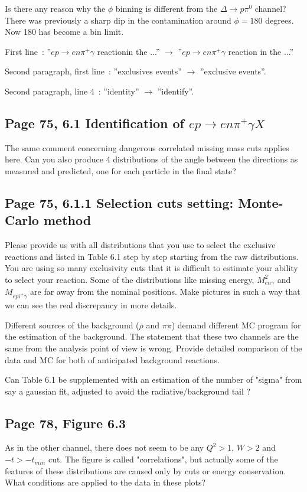 \documentclass[11pt]{paper}
\begin{document}
Is there any reason why the $\phi$ binning is different from the $\Delta\rightarrow p\pi^0$ channel?
There was previously a sharp dip in the contamination around $\phi=180$ degrees.
Now 180 has become a bin limit.

First line~: ''$ep\rightarrow en\pi^+\gamma$ reactionin the ...'' $\rightarrow$ ''$ep\rightarrow en\pi^+\gamma$ reaction in the ...''

Second paragraph, first line~: ''exclusives events'' $\rightarrow$ ''exclusive events''.

Second paragraph, line 4~: ''identity'' $\rightarrow$ ''identify''.
 
\subsection*{Page 75, 6.1 Identification of $ep\rightarrow en\pi^+\gamma X$}
 
The same comment concerning dangerous correlated missing mass cuts applies here.
Can you also produce 4 distributions of the angle between the directions as measured and predicted, one for each particle in the final state?

\subsection*{Page 75, 6.1.1 Selection cuts setting: Monte-Carlo method} 

Please provide us with all distributions that you use to select the exclusive reactions and listed in Table 6.1 step by step starting from the raw distributions. 
You are using so many exclusivity cuts that it is difficult to estimate your ability to select your reaction. 
Some of the distributions like missing energy, $M^2_{en\gamma}$ and $M_{epi^+\gamma} $ are
far away from the nominal positions. Make pictures in such a way that we can see the real discrepancy in more details. 

Different sources of the background ($\rho$ and $\pi\pi$) demand different MC program for the estimation of the background.
The statement that these two channels are the same from the analysis point of view is wrong. Provide detailed comparison of the data and MC for both of anticipated background reactions. 

Can Table 6.1 be supplemented with an estimation of the number of "sigma" from say a gaussian fit, adjusted to avoid the radiative/background tail ?

\subsection*{Page 78, Figure 6.3}
As in the other channel, there does not seem to be any $Q^2>1$, $W>2$ and $-t>-t_{min} $ cut. The figure is called "correlations", but actually some of the features of these distributions are caused only by cuts or energy conservation. What conditions are applied to the data in these plots? 
\end{document}
